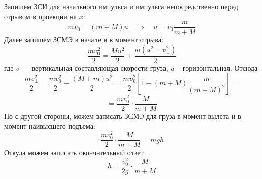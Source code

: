 \documentclass[a5paper,10pt]{article}
\begin{document}
Запишем ЗСИ для начального импульса и импульса непосредственно перед отрывом в проекции на $x$:
\begin{equation}
    m{v_0}=(m+M)u
    \quad\Rightarrow\quad
    u=v_0\frac{m}{m+M}
\end{equation}
Далее запишем ЗСМЭ в начале и в момент отрыва:
\begin{equation}
    \frac{mv_0^2}{2}=\frac{Mu^2}{2}+\frac{m(u^2+v_\perp^2)}{2}
\end{equation}
где $v_\perp$ -- вертикальная составляющая скорости груза, $u$ -- горизонтальная.
Отсюда
\begin{equation}
    \frac{mv_\perp^2}{2}=\frac{mv_0^2}{2}-\frac{(M+m)u^2}{2}=
    \frac{mv_0^2}{2}\left[1-(m+M)\frac{m}{(m+M)^2}\right]=
\end{equation}
\begin{equation}
    = \frac{mv_0^2}{2}\cdot\frac{M}{m+M}
\end{equation}
Но с другой стороны, можем записать ЗСМЭ для груза в момент вылета и в момент наивысшего подъема:
\begin{equation}
    \frac{mv_0^2}{2}\cdot\frac{M}{m+M}=mgh
\end{equation}
Откуда можем записать окончательный ответ
\begin{equation}
    h=\frac{v_0^2}{2g}\cdot\frac{M}{m+M}
\end{equation}


\end{document}
